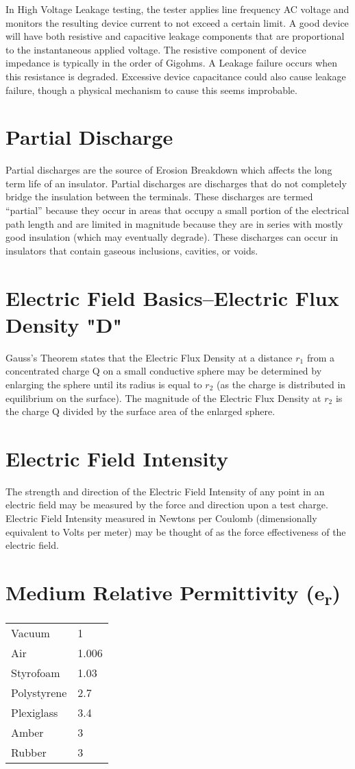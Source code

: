In High Voltage Leakage testing, the tester applies line frequency AC voltage and monitors the resulting device current to not exceed a certain limit. A good device will have both resistive and capacitive leakage components that are proportional to the instantaneous applied voltage. The resistive component of device impedance is typically in the order of Gigohms. A Leakage failure occurs when this resistance is degraded. Excessive device capacitance could also cause leakage failure, though a physical mechanism to cause this seems improbable.

\section*{Partial Discharge}
Partial discharges are the source of Erosion Breakdown which affects the long term life of an insulator. Partial discharges are discharges that do not completely bridge the insulation between the terminals. These discharges are termed “partial” because they occur in areas that occupy a small portion of the electrical path length and are limited in magnitude because they are in series with mostly good insulation (which may eventually degrade). These discharges can occur in insulators that contain gaseous inclusions, cavities, or voids.

\section*{Electric Field Basics--Electric Flux Density "D"}
Gauss’s Theorem states that the Electric Flux Density at a distance $r_1$ from a concentrated charge Q on a small conductive sphere may be determined by enlarging the sphere until its radius is equal to $r_2$ (as the charge is distributed in equilibrium on the surface). The magnitude of the Electric Flux Density at $r_2$ is the charge Q divided by the surface area of the enlarged sphere.

\section*{Electric Field Intensity}
The strength and direction of the Electric Field Intensity of any point in an electric field may be measured by the force and direction upon a test charge. Electric Field Intensity measured in Newtons per Coulomb (dimensionally equivalent to Volts per meter) may be thought of as the force effectiveness of the electric field.

\section*{Medium Relative Permittivity (e\textsubscript{r})}
\begin{tabular}{l l}
Vacuum	& 1 \\
Air	& 1.006\\
Styrofoam	& 1.03\\
Polystyrene	& 2.7\\
Plexiglass	& 3.4\\
Amber	& 3\\
Rubber &3 \\
\end{tabular}

